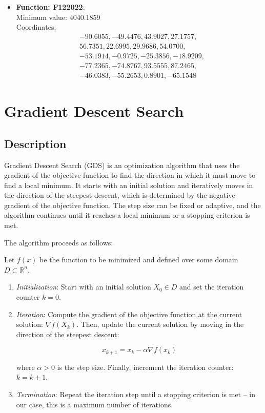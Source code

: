 \documentclass{article}
\begin{document}
\begin{itemize}
  \item \textbf{Function: F122022}: \\
    Minimum value: 4040.1859 \\
    Coordinates:
    \[
      \begin{aligned}
        & -90.6055, -49.4476, 43.9027, 27.1757, \\
        & 56.7351, 22.6995, 29.9686, 54.0700, \\
        & -53.1914, -0.9725, -25.3856, -18.9209, \\
        & -77.2365, -74.8767, 93.5555, 87.2465, \\
        & -46.0383, -55.2653, 0.8901, -65.1548
      \end{aligned}
    \]
\end{itemize}

\section{Gradient Descent Search}

\subsection{Description}

Gradient Descent Search (GDS) is an optimization algorithm that uses
the gradient of the objective function to find the direction in which
it must move to find a local minimum. It starts with an initial
solution and iteratively moves in the direction of the steepest
descent, which is determined by the negative gradient of the
objective function. The step size can be fixed or adaptive, and the
algorithm continues until it reaches a local minimum or a stopping
criterion is met.

The algorithm proceeds as follows:

Let $f(x)$ be the function to be minimized and defined over some domain
$D \subset \mathbb{R}^n$.

\begin{enumerate}
  \item \textit{Initialization}: Start with an initial solution $X_0
    \in D$ and set the iteration counter $k = 0$.
  \item \textit{Iteration}: Compute the gradient of the objective
    function at the current solution: $\nabla f(X_k)$. Then, update
    the current solution by moving in the direction of the steepest
    descent:

    $$ x_{k+1} = x_k - \alpha \nabla f(x_k) $$

    where $\alpha > 0$ is the step size. Finally, increment the
    iteration counter: $k = k + 1$.
  \item \textit{Termination}: Repeat the iteration step until a
    stopping criterion is met -- in our case, this is a maximum
    number of iterations.
\end{enumerate}
\end{document}

